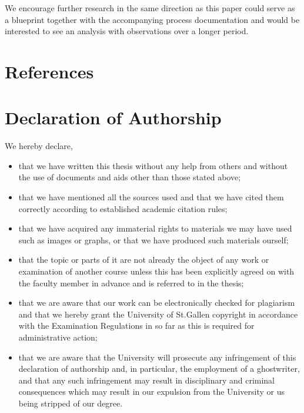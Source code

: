 \documentclass[a4paper,american,12pt]{article}
\begin{document}
\begin{spacing}{1.2}
We encourage further research in the same direction as this paper could serve as a blueprint together with the accompanying process documentation and would be interested to see an analysis with observations over a longer period. 


\clearpage
		
\end{spacing}

\clearpage

\section{References}
\printbibliography[heading=none]

\clearpage

\section{Declaration of Authorship}
We hereby declare,
\begin{itemize}
\item that we have written this thesis without any help from others and without the use of documents and aids other than those stated above;
\item that we have mentioned all the sources used and that we have cited them correctly according to established academic citation rules;
\item that we have acquired any immaterial rights to materials we may have used such as images or graphs, or that we have produced such materials ourself;
\item that the topic or parts of it are not already the object of any work or examination of another course unless this has been explicitly agreed on with the faculty member in advance and is referred to in the thesis;
\item that we are aware that our work can be electronically checked for plagiarism and that we hereby grant the University of St.Gallen copyright in accordance with the Examination Regulations in so far as this is required for administrative action;
\item that we are aware that the University will prosecute any infringement of this declaration of authorship and, in particular, the employment of a ghostwriter, and that any such infringement may result in disciplinary and criminal consequences which may result in our expulsion from the University or us being stripped of our degree.
\end{itemize}
\end{document}
